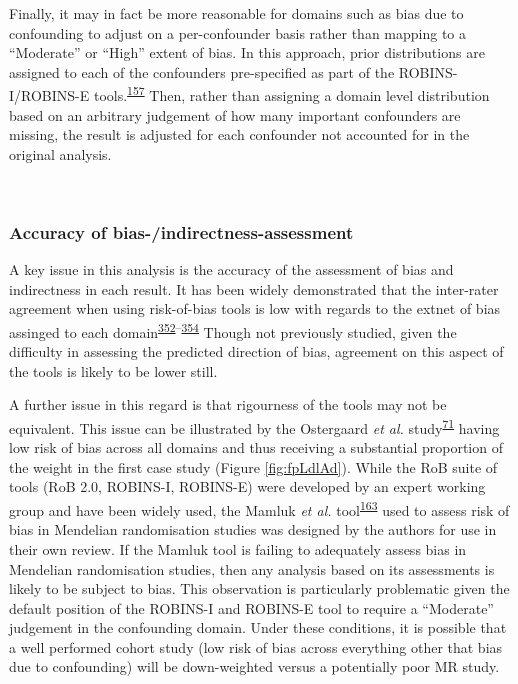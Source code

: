 \documentclass[a4paper, twoside]{templates/ociamthesis}
\begin{document}
Finally, it may in fact be more reasonable for domains such as bias due to confounding to adjust on a per-confounder basis rather than mapping to a ``Moderate'' or ``High'' extent of bias. In this approach, prior distributions are assigned to each of the confounders pre-specified as part of the ROBINS-I/ROBINS-E tools.\textsuperscript{\protect\hyperlink{ref-sterne2016}{157}} Then, rather than assigning a domain level distribution based on an arbitrary judgement of how many important confounders are missing, the result is adjusted for each confounder not accounted for in the original analysis.

~

\hypertarget{accuracy-of-bias-indirectness-assessment}{%
\subsubsection{Accuracy of bias-/indirectness-assessment}\label{accuracy-of-bias-indirectness-assessment}}

A key issue in this analysis is the accuracy of the assessment of bias and indirectness in each result. It has been widely demonstrated that the inter-rater agreement when using risk-of-bias tools is low with regards to the extnet of bias assinged to each domain\textsuperscript{\protect\hyperlink{ref-hartling2011}{352}--\protect\hyperlink{ref-minozzi2020}{354}} Though not previously studied, given the difficulty in assessing the predicted direction of bias, agreement on this aspect of the tools is likely to be lower still.

A further issue in this regard is that rigourness of the tools may not be equivalent. This issue can be illustrated by the Ostergaard \emph{et al.} study\textsuperscript{\protect\hyperlink{ref-ostergaard2015}{71}} having low risk of bias across all domains and thus receiving a substantial proportion of the weight in the first case study (Figure \ref{fig:fpLdlAd}). While the RoB suite of tools (RoB 2.0, ROBINS-I, ROBINS-E) were developed by an expert working group and have been widely used, the Mamluk \emph{et al.} tool\textsuperscript{\protect\hyperlink{ref-mamluk2020}{163}} used to assess risk of bias in Mendelian randomisation studies was designed by the authors for use in their own review. If the Mamluk tool is failing to adequately assess bias in Mendelian randomisation studies, then any analysis based on its assessments is likely to be subject to bias. This observation is particularly problematic given the default position of the ROBINS-I and ROBINS-E tool to require a ``Moderate'' judgement in the confounding domain. Under these conditions, it is possible that a well performed cohort study (low risk of bias across everything other that bias due to confounding) will be down-weighted versus a potentially poor MR study.
\end{document}
